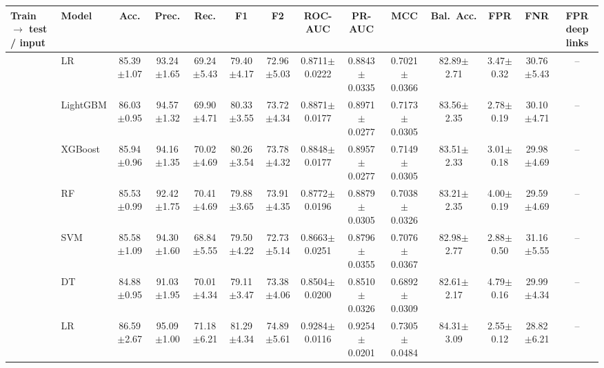 \begin{tabular}{@{}llcccccccccccc@{}}
\toprule
\textbf{Train $\rightarrow$ test / input} & \textbf{Model} & \textbf{Acc.} & \textbf{Prec.} & \textbf{Rec.} & \textbf{F1} & \textbf{F2} & \textbf{ROC-AUC} & \textbf{PR-AUC} & \textbf{MCC} & \textbf{Bal.\ Acc.} & \textbf{FPR} & \textbf{FNR} & \textbf{FPR deep links}\\
\midrule
{} & LR & 85.39{\tiny$\pm$1.07} & 93.24{\tiny$\pm$1.65} & 69.24{\tiny$\pm$5.43} & 79.40{\tiny$\pm$4.17} & 72.96{\tiny$\pm$5.03} & 0.8711{\tiny$\pm$0.0222} & 0.8843{\tiny$\pm$0.0335} & 0.7021{\tiny$\pm$0.0366} & 82.89{\tiny$\pm$2.71} & 3.47{\tiny$\pm$0.32} & 30.76{\tiny$\pm$5.43} & --\\
 & LightGBM & 86.03{\tiny$\pm$0.95} & 94.57{\tiny$\pm$1.32} & 69.90{\tiny$\pm$4.71} & 80.33{\tiny$\pm$3.55} & 73.72{\tiny$\pm$4.34} & 0.8871{\tiny$\pm$0.0177} & 0.8971{\tiny$\pm$0.0277} & 0.7173{\tiny$\pm$0.0305} & 83.56{\tiny$\pm$2.35} & 2.78{\tiny$\pm$0.19} & 30.10{\tiny$\pm$4.71} & --\\
 & XGBoost & 85.94{\tiny$\pm$0.96} & 94.16{\tiny$\pm$1.35} & 70.02{\tiny$\pm$4.69} & 80.26{\tiny$\pm$3.54} & 73.78{\tiny$\pm$4.32} & 0.8848{\tiny$\pm$0.0177} & 0.8957{\tiny$\pm$0.0277} & 0.7149{\tiny$\pm$0.0305} & 83.51{\tiny$\pm$2.33} & 3.01{\tiny$\pm$0.18} & 29.98{\tiny$\pm$4.69} & --\\
 & RF & 85.53{\tiny$\pm$0.99} & 92.42{\tiny$\pm$1.75} & 70.41{\tiny$\pm$4.69} & 79.88{\tiny$\pm$3.65} & 73.91{\tiny$\pm$4.35} & 0.8772{\tiny$\pm$0.0196} & 0.8879{\tiny$\pm$0.0305} & 0.7038{\tiny$\pm$0.0326} & 83.21{\tiny$\pm$2.35} & 4.00{\tiny$\pm$0.19} & 29.59{\tiny$\pm$4.69} & --\\
 & SVM & 85.58{\tiny$\pm$1.09} & 94.30{\tiny$\pm$1.60} & 68.84{\tiny$\pm$5.55} & 79.50{\tiny$\pm$4.22} & 72.73{\tiny$\pm$5.14} & 0.8663{\tiny$\pm$0.0251} & 0.8796{\tiny$\pm$0.0355} & 0.7076{\tiny$\pm$0.0367} & 82.98{\tiny$\pm$2.77} & 2.88{\tiny$\pm$0.50} & 31.16{\tiny$\pm$5.55} & --\\
 & DT & 84.88{\tiny$\pm$0.95} & 91.03{\tiny$\pm$1.95} & 70.01{\tiny$\pm$4.34} & 79.11{\tiny$\pm$3.47} & 73.38{\tiny$\pm$4.06} & 0.8504{\tiny$\pm$0.0200} & 0.8510{\tiny$\pm$0.0326} & 0.6892{\tiny$\pm$0.0309} & 82.61{\tiny$\pm$2.17} & 4.79{\tiny$\pm$0.16} & 29.99{\tiny$\pm$4.34} & --\\
\midrule
{} & LR & 86.59{\tiny$\pm$2.67} & 95.09{\tiny$\pm$1.00} & 71.18{\tiny$\pm$6.21} & 81.29{\tiny$\pm$4.34} & 74.89{\tiny$\pm$5.61} & 0.9284{\tiny$\pm$0.0116} & 0.9254{\tiny$\pm$0.0201} & 0.7305{\tiny$\pm$0.0484} & 84.31{\tiny$\pm$3.09} & 2.55{\tiny$\pm$0.12} & 28.82{\tiny$\pm$6.21} & --\\

\end{tabular}
